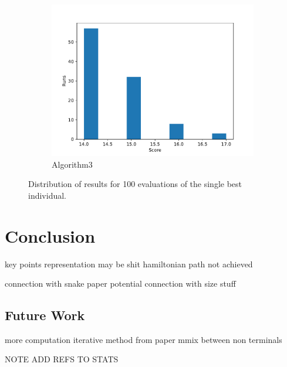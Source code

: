 \documentclass[12pt,a4paper]{article}
\begin{document}
\begin{figure}[h!]
\begin{subfigure}{.33\textwidth}
				\includegraphics[width=\linewidth]{../code/plots/alg3_best_dist}
				\caption{Algorithm3}
				\label{fig:alg3_best_dist}
			\end{subfigure}
			
			\caption{Distribution of results for 100 evaluations of the single best individual.}
			\label{fig:best_dist}
		\end{figure}
		
		
		

		

	\section{Conclusion} \label{conclusions}
	
	key points
	representation may be shit
	hamiltonian path not achieved
	
	connection with snake paper
	potential connection with size stuff
	
	
	
	\subsection{Future Work}
	more computation
	iterative method from paper
	mmix between non terminals
	
	NOTE ADD REFS TO STATS

	\printbibliography
	
	\appendix
	
\end{document}
